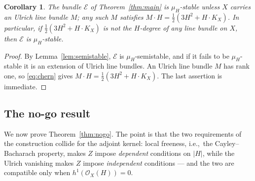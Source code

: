 \documentclass[10pt,a4paper]{amsart}
\newtheorem{corollary}[theorem]{Corollary}
\newcommand{\OO}{\mathcal{O}}
\newcommand{\EE}{\mathcal{E}}
\begin{document}
\begin{corollary}\label{cor:stable}
The bundle $\EE$ of Theorem~\ref{thm:main} is $\mu_H$-stable unless $X$ carries an Ulrich line bundle $M$; any such $M$ satisfies $M\cdot H=\tfrac12(3H^2+H\cdot K_X)$. In particular, if $\tfrac12(3H^2+H\cdot K_X)$ is not the $H$-degree of any line bundle on $X$, then $\EE$ is $\mu_H$-stable.
\end{corollary}

\begin{proof}
By Lemma~\ref{lem:semistable}, $\EE$ is $\mu_H$-semistable, and if it fails to be $\mu_H$-stable it is an extension of Ulrich line bundles. An Ulrich line bundle $M$ has rank one, so \eqref{eq:chern} gives $M\cdot H=\tfrac12(3H^2+H\cdot K_X)$. The last assertion is immediate.
\end{proof}

\subsection{The no-go result}\label{subsec:nogo}
We now prove Theorem~\ref{thm:nogo}. The point is that the two requirements of the construction collide for the adjoint kernel: local freeness, i.e.,\ the Cayley--Bacharach property, makes $Z$ impose \emph{dependent} conditions on $|H|$, while the Ulrich vanishing makes $Z$ impose \emph{independent} conditions --- and the two are compatible only when $h^1(\OO_X(H))=0$.
\end{document}
